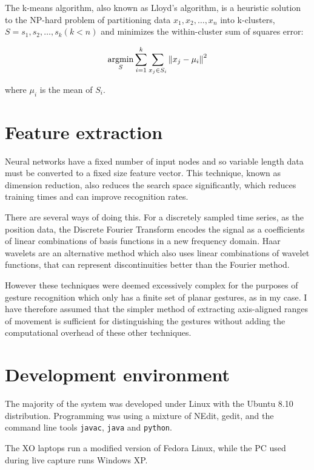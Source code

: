 \documentclass[12pt,a4,notitlepage]{report}
\renewcommand{\_}{\texttt{\symbol{95}}}
\newcommand{\<}{\texttt{\symbol{60}}}
\renewcommand{\>}{\texttt{\symbol{62}}}
\begin{document}
The k-means algorithm, also known as Lloyd's algorithm\cite{K-Means}, is a heuristic solution to the NP-hard problem of partitioning data $x_1, x_2, \ldots, x_n$ into k-clusters, $S = s_1, s_2, \ldots, s_k (k < n)$ and minimizes the within-cluster sum of squares error:

\[
{\underset{S}{\operatornamewithlimits{argmin}}\sum_{i=1}^k \sum_{x_j \in S_i} {\|x_j-\mu_i\|}^2}
\]

where $\mu_i$ is the mean of $S_i$.

\section{Feature extraction}

Neural networks have a fixed number of input nodes and so variable length data must be converted to a fixed size feature vector. This technique, known as dimension reduction, also reduces the search space significantly, which reduces training times and can improve recognition rates.\cite{NeuralPat}

There are several ways of doing this. For a discretely sampled time series, as the position data, the Discrete Fourier Transform encodes the signal as a coefficients of linear combinations of basis functions in a new frequency domain.\cite{DFT} Haar wavelets are an alternative method which also uses linear combinations of wavelet functions, that can represent discontinuities better than the Fourier method.\cite{Haar}

However these techniques were deemed excessively complex for the purposes of gesture recognition which only has a finite set of planar gestures, as in my case. I have therefore assumed that the simpler method of extracting axis-aligned ranges of movement is sufficient for distinguishing the gestures without adding the computational overhead of these other techniques.

\section{Development environment}

The majority of the system was developed under Linux with the Ubuntu 8.10 distribution. Programming was using a mixture of NEdit, gedit, and the command line tools \texttt{javac}, \texttt{java} and \texttt{python}.

The XO laptops run a modified version of Fedora Linux, while the PC used during live capture runs Windows XP.
\end{document}
